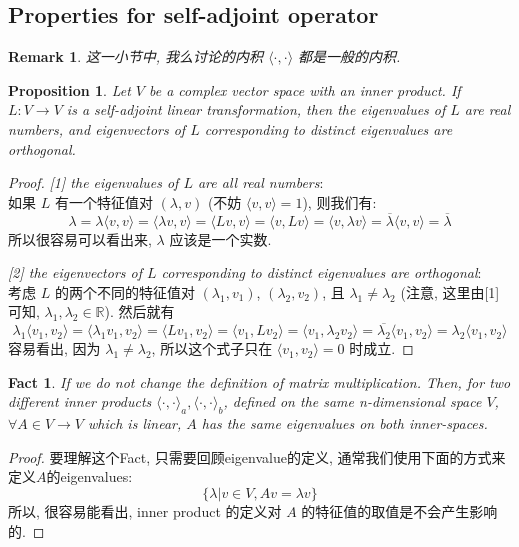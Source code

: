 \documentclass{article}
\newtheorem{fact}{Fact}
\newtheorem{remark}{Remark}
\newtheorem{proposition}{Proposition}
\def\<{\langle}
\def\>{\rangle}
\begin{document}
\subsection{Properties for self-adjoint operator}
\begin{remark}
  这一小节中, 我么讨论的内积 $\<\cdot, \cdot\>$ 都是一般的内积.
\end{remark}
\begin{proposition}
  Let $V$ be a complex vector space with an inner product.
  If $L: V\to V$ is a self-adjoint linear transformation,
  then the eigenvalues of $L$ are real numbers, and eigenvectors of $L$ corresponding to distinct eigenvalues are orthogonal.
\end{proposition}
\begin{proof}
  \emph{[1] the eigenvalues of $L$ are all real numbers}:\\
  如果 $L$ 有一个特征值对 $(\lambda, v)$ (不妨 $\<v, v\> = 1$), 则我们有:
  \[\lambda = \lambda\<v, v\> = \<\lambda v, v\> = \<Lv, v\> = \<v, Lv\> = \<v,\lambda v\> = \overline{\lambda}\<v, v\> = \overline{\lambda}\]
  所以很容易可以看出来, $\lambda$ 应该是一个实数.

  \emph{[2] the eigenvectors of $L$ corresponding to distinct eigenvalues are orthogonal}: \\
  考虑 $L$ 的两个不同的特征值对 $(\lambda_1, v_1)$, $(\lambda_2, v_2)$, 且 $\lambda_1 \not= \lambda_2$ (注意, 这里由[1]可知, $\lambda_1, \lambda_2\in\mathbb{R}$).
  然后就有
  \[\lambda_1\<v_1, v_2\> = \<\lambda_1v_1, v_2\> = \<Lv_1, v_2\> = \<v_1, Lv_2\> = \<v_1,\lambda_2v_2\> = \overline{\lambda_2}\<v_1, v_2\> = \lambda_2\<v_1, v_2\>\]
  容易看出, 因为 $\lambda_1 \not= \lambda_2$, 所以这个式子只在 $\<v_1, v_2\> = 0$ 时成立.
\end{proof}

\begin{fact}
  If we do not change the definition of matrix multiplication.
  Then, for two different inner products $\<\cdot, \cdot\>_a, \<\cdot, \cdot\>_b$, defined on the same n-dimensional space $V$,
  $\forall A\in V\to V$ which is linear, $A$ has the same eigenvalues on both inner-spaces.
\end{fact}
\begin{proof}
  要理解这个Fact, 只需要回顾eigenvalue的定义, 通常我们使用下面的方式来定义$A$的eigenvalues:
  \[\{\lambda | v\in V, Av = \lambda v\}\]
  所以, 很容易能看出, inner product 的定义对 $A$ 的特征值的取值是不会产生影响的.
\end{proof}
\end{document}
